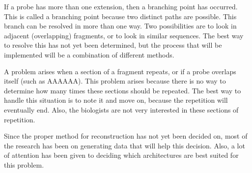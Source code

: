 If a probe has more than one extension, then a branching point has occurred.
This is called a branching point because two distinct paths are possible.
This branch can be resolved in more than one way.  Two possibilities are
to look in adjacent (overlapping) fragments, or to look in similar 
sequences.  The best way to resolve this has not yet been determined, but
the process that will be implemented will be a combination of different
methods.

A problem arises when a section of a fragment repeats, or if a probe
overlaps itself (such as AAAAAA).  This problem arises because there is no
way to determine how many times these sections should be repeated.  The
best way to handle this situation is to note it and move on, because the
repetition will eventually end.
Also, the biologists are not very interested in these
sections of repetition.

Since the proper method for reconstruction has not yet been decided on,
most of the research has been on generating data that will help this
decision.  Also, a lot of attention has been given to deciding which
architectures are best suited for this problem.

